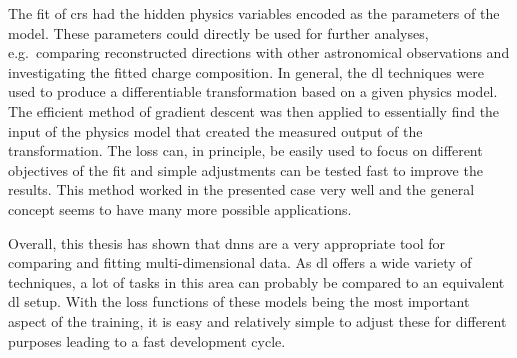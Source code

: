 The fit of \glspl{cr} had the hidden physics variables encoded as the parameters of the model. These parameters could directly be used for further analyses, e.g.\ comparing reconstructed directions with other astronomical observations and investigating the fitted charge composition. In general, the \gls{dl} techniques were used to produce a differentiable transformation based on a given physics model. The efficient method of gradient descent was then applied to essentially find the input of the physics model that created the measured output of the transformation. The loss can, in principle, be easily used to focus on different objectives of the fit and simple adjustments can be tested fast to improve the results. This method worked in the presented case very well and the general concept seems to have many more possible applications.

Overall, this thesis has shown that \glspl{dnn} are a very appropriate tool for comparing and fitting multi-dimensional data. As \gls{dl} offers a wide variety of techniques, a lot of tasks in this area can probably be compared to an equivalent \gls{dl} setup. With the loss functions of these models being the most important aspect of the training, it is easy and relatively simple to adjust these for different purposes leading to a fast development cycle.
